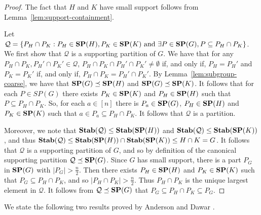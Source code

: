 \documentclass[../paper.tex]{subfiles}
\begin{document}
\begin{proof}
  The fact that $H$ and $K$ have small support follows from
  Lemma~\ref{lem:support-containment}.

  Let $\mathcal{Q} = \{P_H \cap P_K : P_H \in \text{\textbf{SP}}(H), P_K \in \text{\textbf{SP}}(K) \text{ and
  } \exists P \in \text{\textbf{SP}}(G), P \subseteq P_H \cap P_K \}$. We first show that
  $\mathcal{Q}$ is a supporting partition of $G$. We have that for any $P_H \cap
  P_K, P_H' \cap P_K' \in \mathcal{Q}$, $P_H \cap P_K \cap P_H' \cap P_K' \neq
  \emptyset$ if, and only if, $P_H = P_H'$ and $P_K = P_K'$ if, and only if,
  $P_H \cap P_K = P_H' \cap P_K'$. By Lemma~\ref{lem:subgroup-coarse}, we have
  that $\text{\textbf{SP}}(G) \preceq \text{\textbf{SP}}(H)$ and $\text{\textbf{SP}}(G) \preceq \text{\textbf{SP}}(K)$. It follows that for
  each $P \in SP(G)$ there exists $P_K \in \text{\textbf{SP}}(K)$ and $P_H \in \text{\textbf{SP}}(H)$ such
  that $P \subseteq P_H \cap P_K$. So, for each $a \in [n]$ there is $P_a \in
  \text{\textbf{SP}}(G)$, $P_H \in \text{\textbf{SP}}(H)$ and $P_K \in \text{\textbf{SP}}(K)$ such that $a \in P_a \subseteq
  P_H \cap P_K$. It follows that $\mathcal{Q}$ is a partition.

  Moreover, we note that $\text{\textbf{Stab}}(\mathcal{Q}) \leq \text{\textbf{Stab}}(\text{\textbf{SP}}(H))$ and
  $\text{\textbf{Stab}}(\mathcal{Q}) \leq \text{\textbf{Stab}}(\text{\textbf{SP}}(K))$, and thus $\text{\textbf{Stab}}(\mathcal{Q}) \leq
  \text{\textbf{Stab}}(\text{\textbf{SP}}(H)) \cap \text{\textbf{Stab}}(\text{\textbf{SP}}(K)) \leq H \cap K = G$. It follows that
  $\mathcal{Q}$ is a supporting partition of $G$, and so by definition of the
  canonical supporting partition $\mathcal{Q} \preceq \text{\textbf{SP}} (G)$. Since $G$ has
  small support, there is a part $P_G$ in $\text{\textbf{SP}}(G)$ with $|P_G| > \frac{n}{2}$.
  Then there exists $P_H \in \text{\textbf{SP}}(H)$ and $P_K \in \text{\textbf{SP}}(K)$ such that $P_G
  \subseteq P_H \cap P_K$, and so $\vert P_H \cap P_K \vert > \frac{n}{2}$. Thus
  $P_H \cap P_K$ is the unique largest element in $\mathcal{Q}$. It follows from
  $\mathcal{Q} \preceq \text{\textbf{SP}}(G)$ that $P_G \subseteq P_H \cap P_K \subseteq
  P_G$.



\end{proof}

We state the following two results proved by Anderson and Dawar
\cite{AndersonD17}.
\end{document}
